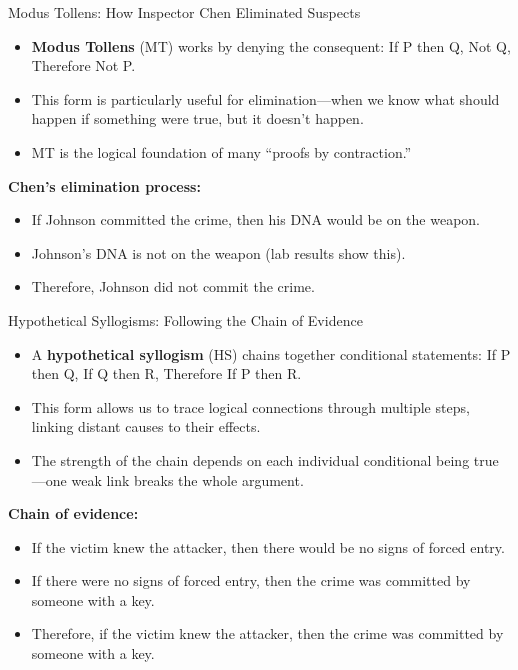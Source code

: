 \documentclass{beamer}
\begin{document}
	\begin{frame}{Modus Tollens: How Inspector Chen Eliminated Suspects}
		\begin{itemize}
			\item \textbf{Modus Tollens} (MT) works by denying the consequent: If P then Q, Not Q, Therefore Not P.
			\item This form is particularly useful for elimination—when we know what should happen if something were true, but it doesn't happen.
			\item MT is the logical foundation of many ``proofs by contraction.''
		\end{itemize}
		
		\begin{example}
			\textbf{Chen's elimination process:}
			\begin{itemize}
				\item If Johnson committed the crime, then his DNA would be on the weapon.
				\item Johnson's DNA is not on the weapon (lab results show this).
				\item Therefore, Johnson did not commit the crime.
			\end{itemize}
		\end{example}
	\end{frame}
	
	\begin{frame}{Hypothetical Syllogisms: Following the Chain of Evidence}
		\begin{itemize}
			\item A \textbf{hypothetical syllogism} (HS) chains together conditional statements: If P then Q, If Q then R, Therefore If P then R.
			\item This form allows us to trace logical connections through multiple steps, linking distant causes to their effects.
			\item The strength of the chain depends on each individual conditional being true—one weak link breaks the whole argument.
		\end{itemize}
		
		\begin{example}
			\textbf{Chain of evidence:}
			\scriptsize
			\begin{itemize}
				\item If the victim knew the attacker, then there would be no signs of forced entry.
				\item If there were no signs of forced entry, then the crime was committed by someone with a key.
				\item Therefore, if the victim knew the attacker, then the crime was committed by someone with a key.
			\end{itemize}
		\end{example}
	\end{frame}
	
\end{document}

